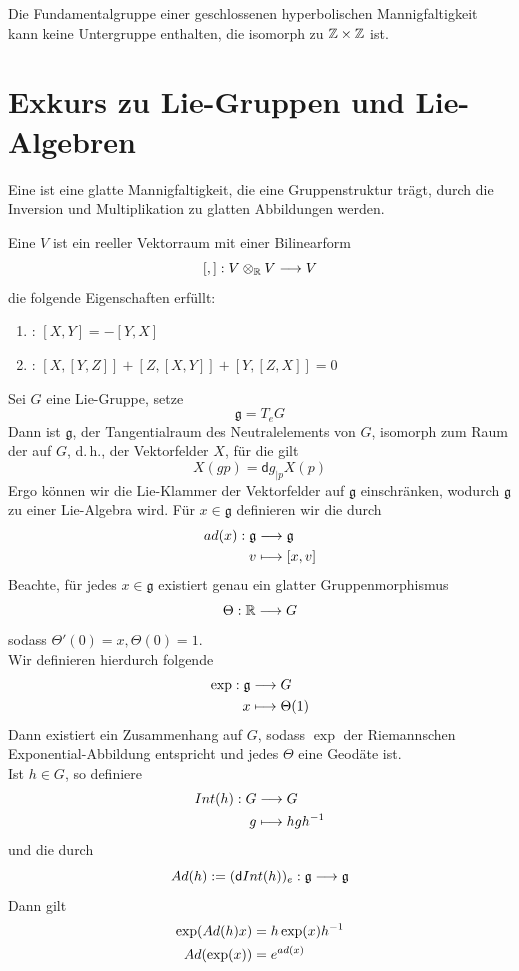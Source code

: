 \documentclass{book}
\renewcommand{\d}{\textsf{d}}
\newcommand{\g}{\mathfrak{g}}
\begin{document}
\Kor{}
Die Fundamentalgruppe einer geschlossenen hyperbolischen Mannigfaltigkeit kann keine Untergruppe enthalten, die isomorph zu $\mathbb{Z}\times \mathbb{Z}$ ist.

\section{Exkurs zu Lie-Gruppen und Lie-Algebren}

\Def{}
Eine  ist eine glatte Mannigfaltigkeit, die eine Gruppenstruktur trägt, durch die Inversion und Multiplikation zu glatten Abbildungen werden.

\Def{}
Eine  $V$ ist ein reeller Vektorraum mit einer Bilinearform
\[ [,] : V\otimes_{\mathbb{R}} V \overset{}{\longrightarrow} V \]
die folgende Eigenschaften erfüllt:
\begin{enumerate}[1.)]
	\item {}: $[X,Y] = -[Y,X]$
	\item {}: $[X,[Y,Z]] + [Z,[X,Y]] + [Y,[Z,X]] = 0$
\end{enumerate}


\Bem{}
Sei $G$ eine Lie-Gruppe, setze
\[ \g = T_eG \]
Dann ist $\g$, der Tangentialraum des Neutralelements von $G$, isomorph zum Raum der  auf $G$, d.\,h., der Vektorfelder $X$, für die gilt
\[ X(gp) = \d g_{|p}X(p) \]
Ergo können wir die Lie-Klammer der Vektorfelder auf $\g$ einschränken, wodurch $\g$ zu einer Lie-Algebra wird. Für $x\in\g$ definieren wir die  durch
\begin{align*}
ad(x) : \g & \Pfeil{} \g\\
v & \longmapsto [x,v]
\end{align*}
Beachte, für jedes $x \in \g$ existiert genau ein glatter Gruppenmorphismus
\[ \Theta : \mathbb{R} \overset{}{\longrightarrow} G \]
sodass $\Theta'(0) = x, \Theta(0) = 1$.\\
Wir definieren hierdurch folgende 
\begin{align*}
\exp : \g &\Pfeil{} G\\
x &\longmapsto \Theta(1)
\end{align*}
Dann existiert ein Zusammenhang auf $G$, sodass $\exp$ der Riemannschen Exponential-Abbildung entspricht und jedes $\Theta$ eine Geodäte ist.\\
Ist $h\in G$, so definiere
\begin{align*}
Int(h) :G& \overset{}{\longrightarrow} G\\
g & \longmapsto hgh^{-1}
\end{align*}
und die  durch
\[ Ad(h) := (\d Int(h))_{e} : \g \Pfeil{} \g \]
Dann gilt
\begin{align*}
\exp(Ad(h)x) &= h\exp(x)h^{-1}\\
Ad(\exp(x)) &= e^{ad(x)}
\end{align*}
\end{document}
